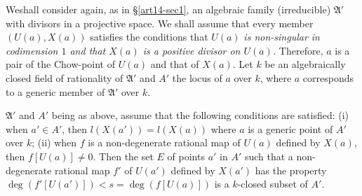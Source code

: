 We\pageoriginale shall consider again, as in \S \ref{art14-sec1}, an algebraic family (irreducible) $\mathfrak{A}'$ with divisors in a projective space. We shall assume that every member $(U(a),X(a))$ satisfies the conditions that $U(a)$ {\em is non-singular in codimension $1$ and that $X(a)$ is a positive divisor on $U(a)$.} Therefore, $a$ is a pair of the Chow-point of $U(a)$ and that of $X(a)$. Let $k$ be an algebraically closed field of rationality of $\mathfrak{A}'$ and $A'$ the locus of $a$ over $k$, where $a$ corresponds to a generic member of $\mathfrak{A}'$ over $k$.

\begin{subprop}\label{art14-app-prop2.2}
$\mathfrak{A}'$ and $A'$ being as above, assume that the following conditions are satisfied: {\rm(i)} when $a'\in A'$, then $l(X(a'))=l(X(a))$ where $a$ is a generic point of $A'$ over $k$; {\rm(ii)} when $f$ is a non-degenerate rational map of $U(a)$ defined by $X(a)$, then $f[U(a)]\neq 0$. Then the set $E$ of points $a'$ in $A'$ such that a non-degenerate rational map $f'$ of $U(a')$ defined by $X(a')$ has the property $\deg (f'[U(a')])<s=\deg (f[U(a)])$ is a $k$-closed subset of $A'$.
\end{subprop}

